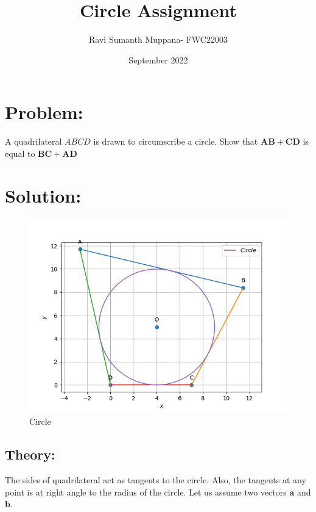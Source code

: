 \documentclass[a4paper,12pt,twocolumn]{article}
\title{Circle Assignment}
\author{Ravi Sumanth Muppana- FWC22003}
\date{September 2022}
\let\vec\mathbf
\begin{document}
\maketitle
\section{Problem:}
A quadrilateral $ABCD$ is drawn to circumscribe a circle. Show that $\vec{AB+CD}$ is equal to $\vec{BC+AD}$
\maketitle
\section{Solution:}
\begin{figure}[h]
	\includegraphics[width=\linewidth]{circle.png}
	\caption{Circle}
\end{figure}
\subsection{Theory:}
The sides of quadrilateral act as tangents to the circle. Also, the tangents at any point is at right angle to the radius of the circle. Let us assume two vectors $\vec{a}$ and $\vec{b}$.
\end{document}
